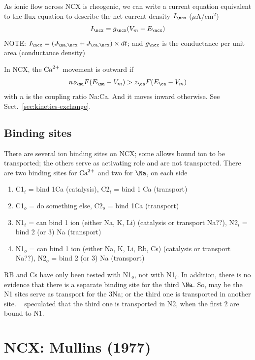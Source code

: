 As ionic flow across NCX is rheogenic, we can write a current equation
equivalent to the flux equation to describe the net current density
$I_\ncx$ ($\mu$A/cm$^2$)
\begin{equation}
  \label{eq:1465}
  I_\ncx = g_\ncx (V_m-E_\ncx)
\end{equation}
NOTE: $I_\ncx = (J_{\na,\ncx}+J_{\ca,\ncx})\times dt$; and $g_\ncx$ is
the conductance per unit area (conductance density)

\begin{framed}
  In NCX, the ${\text{Ca}^{2+}}$ movement is outward if
  \begin{equation}
    \label{eq:1457}
    nz_\na F(E_\na-V_m) > z_\ca F(E_\ca-V_m)
  \end{equation}
  with $n$ is the coupling ratio Na:Ca. And it moves inward
  otherwise. See Sect.~\ref{sec:kinetics-exchange}.
\end{framed}


\subsection{Binding sites}
\label{sec:binding-sites}

There are several ion binding sites on NCX; some allows bound ion to
be transported; the others serve as activating role and are not
transported. There are two binding sites for ${\text{Ca}^{2+}}$ and two for $\Na$,
on each side
\begin{enumerate}
\item C1$_i$ = bind 1Ca (catalysis), C2$_i$ = bind 1 Ca (transport)
\item C1$_o$ = do something else, C2$_o$ = bind 1Ca (transport)
\item N1$_i$ = can bind 1 ion (either Na, K, Li) (catalysis or
  transport Na??), N2$_i$ = bind 2 (or 3) Na (transport)
\item N1$_o$ = can bind 1 ion (either Na, K, Li, Rb, Cs) (catalysis or
  transport Na??), N2$_o$ = bind 2 (or 3) Na (transport)
\end{enumerate}
RB and Cs have only been tested with N1$_o$, not with N1$_i$. In
addition, there is no evidence that there is a separate binding site
for the third $\Na$. So, may be the N1 sites serve as transport for
the 3Na; or the third one is transported in another
site. ~\citep{blaustein1999} speculated that the third one is
transported in N2, when the first 2 are bound to N1. 



\section{NCX: Mullins (1977)}
\label{sec:ncx-mullins-1977}

